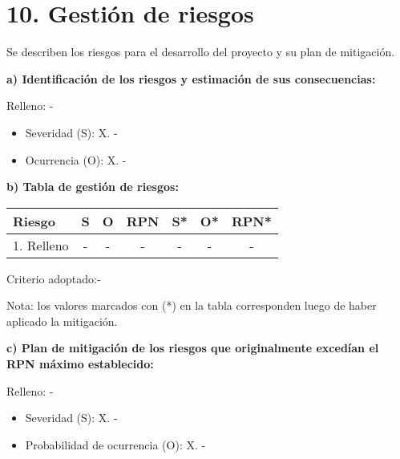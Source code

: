 \section{10. Gestión de riesgos}
\label{sec:riesgos}
Se describen los riesgos para el desarrollo del proyecto y su plan de mitigación.

\textbf{a) Identificación de los riesgos y estimación de sus consecuencias:}
 
Relleno: -
\begin{itemize}
\item Severidad (S): X. -
\item Ocurrencia (O): X. -
\end{itemize}   

\textbf{b) Tabla de gestión de riesgos:}

\begin{table}[htpb]
\centering
\begin{tabularx}{\linewidth}{@{}|X|c|c|c|c|c|c|@{}}
\hline
\rowcolor[HTML]{C0C0C0} 
Riesgo & S & O & RPN & S* & O* & RPN*  \\ \hline
1. Relleno & - & - & - &   - &  -  & - \\ \hline
\end{tabularx}%
\end{table}

Criterio adoptado:-

Nota: los valores marcados con (*) en la tabla corresponden luego de haber aplicado la mitigación.

\textbf{c) Plan de mitigación de los riesgos que originalmente excedían el RPN máximo establecido:}

Relleno: -
\begin{itemize}
\item Severidad (S): X. -
\item Probabilidad de ocurrencia (O): X. -
\end{itemize}